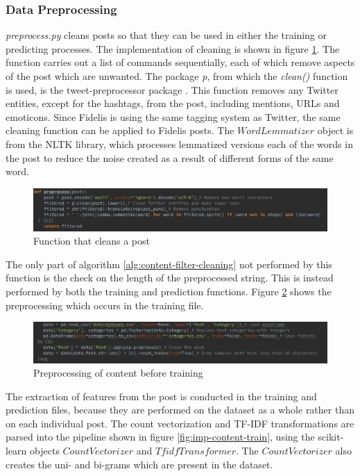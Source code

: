 \subsubsection{Data Preprocessing}
\textit{preprocess.py} cleans posts so that they can be used in either the training or predicting processes. The implementation of cleaning is shown in figure \ref{fig:content-clean}. The function carries out a list of commands sequentially, each of which remove aspects of the post which are unwanted. The package \textit{p}, from which the \textit{clean()} function is used, is the tweet-preprocessor package \cite{TweetPreprocessor}. This function removes any Twitter entities, except for the hashtags, from the post, including mentions, URLs and emoticons. Since Fidelis is using the same tagging system as Twitter, the same cleaning function can be applied to Fidelis posts. The $WordLemmatizer$ object is from the NLTK library, which processes lemmatized versions each of the words in the post to reduce the noise created as a result of different forms of the same word. 

\begin{figure}[H]
\centering
\includegraphics[width=\textwidth]{Images/Implementation/content-clean}
\caption{Function that cleans a post}
\label{fig:content-clean}
\end{figure}

The only part of algorithm \ref{alg:content-filter-cleaning} not performed by this function is the check on the length of the preprocessed string. This is instead performed by both the training and prediction functions. Figure \ref{fig:content-preprocess} shows the preprocessing which occurs in the training file.

\begin{figure}[H]
\centering
\includegraphics[width=\textwidth]{Images/Implementation/content-preprocess}
\caption{Preprocessing of content before training}
\label{fig:content-preprocess}
\end{figure}

The extraction of features from the post is conducted in the training and prediction files, because they are performed on the dataset as a whole rather than on each individual post. The count vectorization and TF-IDF transformations are parsed into the pipeline shown in figure \ref{fig:imp-content-train}, using the scikit-learn objects $CountVectorizer$ and $TfidfTransformer$. The $CountVectorizer$ also creates the uni- and bi-grams which are present in the dataset.

